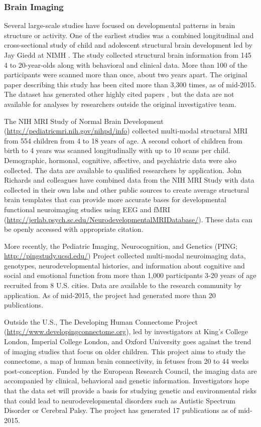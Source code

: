 \documentclass[letterpaper,man,apacite,natbib]{apa6}
\begin{document}
\subsubsection{Brain Imaging}
Several large-scale studies have focused on developmental patterns in brain structure or activity.
One of the earliest studies was a combined longitudinal and cross-sectional study of child and adolescent structural brain development led by Jay Giedd at NIMH \cite{giedd_brain_1999}.
The study collected structural brain information from 145 4 to 20-year-olds along with behavioral and clinical data.
More than 100 of the participants were scanned more than once, about two years apart.
The original paper describing this study has been cited more than 3,300 times, as of mid-2015.
The dataset has generated other highly cited papers \cite{gogtay_dynamic_2004}, but the data are not available for analyses by researchers outside the original investigative team.

The NIH MRI Study of Normal Brain Development (\url{http://pediatricmri.nih.gov/nihpd/info}) collected multi-modal structural MRI from 554 children from 4 to 18 years of age.
A second cohort of children from birth to 4 years was scanned longitudinally with up to 10 scans per child.
Demographic, hormonal, cognitive, affective, and psychiatric data were also collected.
The data are available to qualified researchers by application.
John Richards and colleagues have combined data from the NIH MRI Study with data collected in their own labs and other public sources to create average structural brain templates that can provide more accurate bases for developmental functional neuroimaging studies using EEG and fMRI (\url{http://jerlab.psych.sc.edu/NeurodevelopmentalMRIDatabase/}).
These data can be openly accessed with appropriate citation.

More recently, the Pediatric Imaging, Neurocognition, and Genetics (PING; \url{http://pingstudy.ucsd.edu/}) Project collected multi-modal neuroimaging data, genotypes, neurodevelopmental histories, and information about cognitive and social and emotional function from more than 1,000 participants 3-20 years of age recruited from 8 U.S. cities. 
Data are available to the research community by application.
As of mid-2015, the project had generated more than 20 publications.

Outside the U.S., The Developing Human Connectome Project (\url{http://www.developingconnectome.org}), led by investigators at King’s College London, Imperial College London, and Oxford University goes against the trend of imaging studies that focus on older children.
This project aims to study the connectome, a map of human brain connectivity, in fetuses from 20 to 44 weeks post-conception.
Funded by the European Research Council, the imaging data are accompanied by clinical, behavioral and genetic information.
Investigators hope that the data set will provide a basis for studying genetic and environmental risks that could lead to neurodevelopmental disorders such as Autistic Spectrum Disorder or Cerebral Palsy.
The project has generated 17 publications as of mid-2015.
\end{document}
